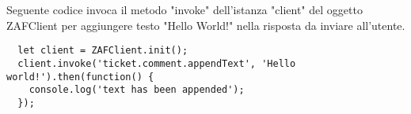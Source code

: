 Seguente codice invoca il metodo "invoke" dell'istanza "client" del oggetto ZAFClient per aggiungere testo "Hello World!" nella risposta da inviare all'utente.  
\\
\begin{lstlisting}
  let client = ZAFClient.init();
  client.invoke('ticket.comment.appendText', 'Hello world!').then(function() {
	console.log('text has been appended');
  });
\end{lstlisting} 